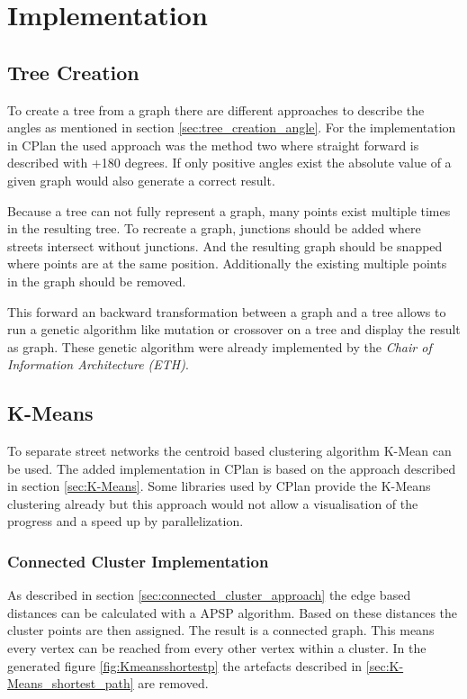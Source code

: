 \pagebreak
\chapter{Implementation}
\section{Tree Creation}
To create a tree from a graph there are different approaches to describe the angles as mentioned in section \ref{sec:tree_creation_angle}. For the implementation in CPlan the used approach was the method two where straight forward is described with +180 degrees. If only positive angles exist the absolute value of a given graph would also generate a correct result.

Because a tree can not fully represent a graph, many points exist multiple times in the resulting tree. To recreate a graph, junctions should be added where streets intersect without junctions. And the resulting graph should be snapped where points are at the same position. Additionally the existing multiple points in the graph should be removed.

This forward an backward transformation between a graph and a tree allows to run a genetic algorithm like mutation or crossover on a tree and display the result as graph. These genetic algorithm were already implemented by the \textit{Chair of Information Architecture (ETH)}.

\pagebreak
\section{K-Means}
To separate street networks the centroid based clustering algorithm K-Mean can be used. The added implementation in CPlan \citep{cPlan:2015} is based on the approach described in section \ref{sec:K-Means}. Some libraries used by CPlan provide the K-Means clustering already but this approach would not allow a visualisation of the progress and a speed up by parallelization.

\subsection{Connected Cluster Implementation} \label{sec:K-Means_shortest_path_impl}
As described in section \ref{sec:connected_cluster_approach} the edge based distances can be calculated with a \gls{APSP} algorithm. Based on these distances the cluster points are then assigned. The result is a connected graph. This means every vertex can be reached from every other vertex within a cluster. In the generated figure \ref{fig:Kmeansshortestp} the artefacts described in \ref{sec:K-Means_shortest_path} are removed.

